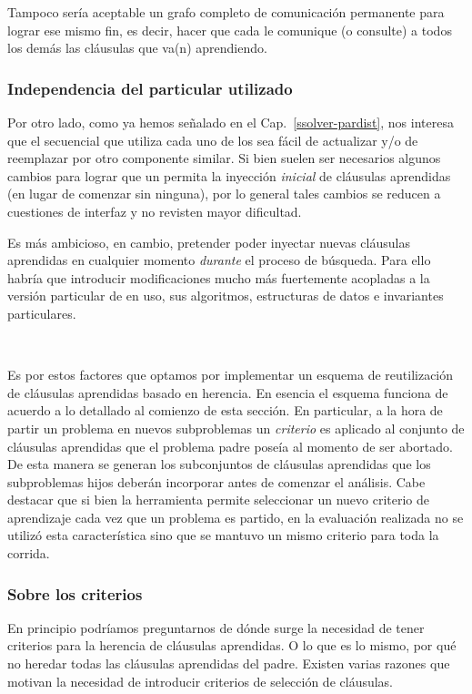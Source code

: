 Tampoco sería aceptable un grafo completo de comunicación permanente para
lograr ese mismo fin, es decir, hacer que cada \w le comunique (o consulte) a
todos los demás las cláusulas que va(n) aprendiendo.


\subsubsection{Independencia del \ssolver particular utilizado}

Por otro lado, como ya hemos señalado en el Cap.~\ref{ssolver-pardist}, nos
interesa que el \ssolver secuencial que utiliza cada uno de los \ws sea fácil
de actualizar y/o de reemplazar por otro componente \ots similar. Si bien
suelen ser necesarios algunos cambios para lograr que un \ssolver permita la
inyección \emph{inicial} de cláusulas aprendidas (en lugar de comenzar sin
ninguna), por lo general tales cambios se reducen a cuestiones de interfaz y
no revisten mayor dificultad.

Es más ambicioso, en cambio, pretender poder inyectar nuevas cláusulas
aprendidas en cualquier momento \emph{durante} el proceso de búsqueda. Para
ello habría que introducir modificaciones mucho más fuertemente acopladas a la
versión particular de \ssolver en uso, sus algoritmos, estructuras de datos e
invariantes particulares.

\

Es por estos factores que optamos por implementar un esquema de reutilización
de cláusulas aprendidas basado en herencia. En esencia el esquema funciona de
acuerdo a lo detallado al comienzo de esta sección. En particular, a la hora
de partir un problema en nuevos subproblemas un \emph{criterio} es aplicado al
conjunto de cláusulas aprendidas que el problema padre poseía al momento de
ser abortado. De esta manera se generan los subconjuntos de cláusulas
aprendidas que los subproblemas hijos deberán incorporar antes de comenzar el
análisis. Cabe destacar que si bien la herramienta permite seleccionar un
nuevo criterio de aprendizaje cada vez que un problema es partido, en la
evaluación realizada no se utilizó esta característica sino que se mantuvo un
mismo criterio para toda la corrida.


\subsubsection{Sobre los criterios}
\label{sec:aboutcriteria}

En principio podríamos preguntarnos de dónde surge la necesidad de tener
criterios para la herencia de cláusulas aprendidas. O lo que es lo mismo, por
qué no heredar todas las cláusulas aprendidas del padre. Existen varias
razones que motivan la necesidad de introducir criterios de selección de
cláusulas.

